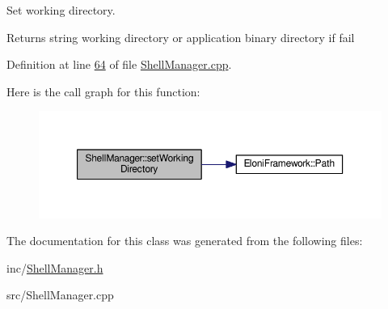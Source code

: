 Set working directory. 

\begin{DoxyReturn}{Returns}
string working directory or application binary directory if fail 
\end{DoxyReturn}


Definition at line \hyperlink{ShellManager_8cpp_source_l00064}{64} of file \hyperlink{ShellManager_8cpp_source}{Shell\-Manager.\-cpp}.



Here is the call graph for this function\-:
\nopagebreak
\begin{figure}[H]
\begin{center}
\leavevmode
\includegraphics[width=350pt]{classShellManager_aeed1b234a317e951f01bdc42a2097d40_cgraph}
\end{center}
\end{figure}




The documentation for this class was generated from the following files\-:\begin{DoxyCompactItemize}
\item 
inc/\hyperlink{ShellManager_8h}{Shell\-Manager.\-h}\item 
src/Shell\-Manager.\-cpp\end{DoxyCompactItemize}
